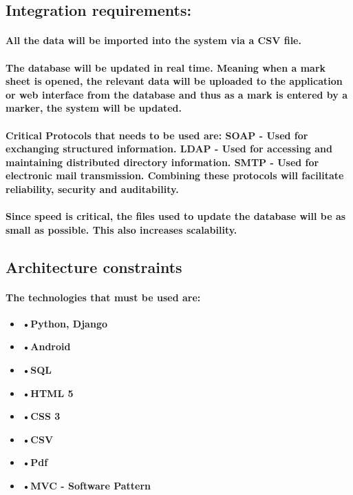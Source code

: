 \documentclass[12pt]{article}
\begin{document}
  \subsection{Integration requirements:}
  \paragraph{All the data will be imported into the system via a CSV file.}
  \paragraph{The database will be updated in real time. Meaning when a mark sheet is opened, the relevant data will be uploaded to the application or web interface from the database and thus as a mark is entered by a marker, the system will be updated.}
  \paragraph{Critical Protocols that needs to be used are:
  SOAP - Used for exchanging structured information.
  LDAP - Used for accessing and maintaining distributed directory information.
  SMTP - Used for electronic mail transmission.
  Combining these protocols will facilitate reliability, security and auditability.}
  \paragraph{Since speed is critical, the files used to update the database will be as small as possible. This also increases scalability.}
  \subsection{Architecture constraints}
  \paragraph{
  The technologies that must be used are:
  }
  \begin{itemize}
  \item \textbf{•Python, Django}
  \item \textbf{•Android}
  \item \textbf{•SQL}
  \item \textbf{•HTML 5}
  \item \textbf{•CSS 3}
  \item \textbf{•CSV}
  \item \textbf{•Pdf}
  \item \textbf{•MVC - Software Pattern}
\end{itemize}
\end{document}
